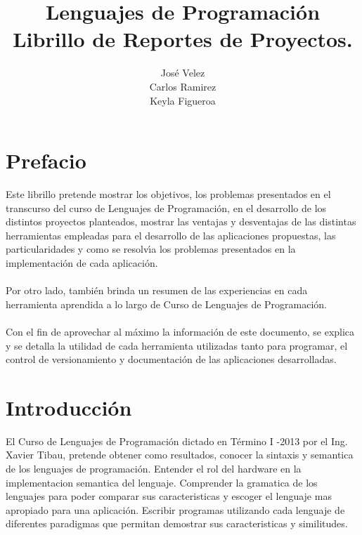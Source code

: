\documentclass[12pt,oneside]{book}
\title{Lenguajes de Programaci\'on \\ Librillo de Reportes de Proyectos.}
\author{Jos\'e Velez \\ Carlos Ramirez \\Keyla Figueroa}
\begin{document}
\maketitle
\tableofcontents



\chapter{Prefacio}

Este librillo pretende mostrar los objetivos, los problemas presentados en el transcurso del curso de Lenguajes de Programaci\'on,
en el desarrollo de los distintos proyectos planteados, mostrar las ventajas y desventajas de las distintas herramientas empleadas
para el desarrollo de las aplicaciones propuestas, las particularidades y como se resolv\'\i{}a los problemas presentados en la implementaci\'on de cada aplicaci\'on. \ \\ \\ 
Por otro lado, tambi\'en brinda un resumen de las experiencias en cada herramienta aprendida a lo largo de Curso de Lenguajes de Programación. \ \\ \\
Con el fin de aprovechar al máximo la información de este documento, se explica y se detalla la utilidad de cada herramienta utilizadas
tanto para programar, el control de versionamiento y documentaci\'on de las aplicaciones desarrolladas.


\chapter{Introducci\'on}

El Curso de Lenguajes de Programaci\'on dictado en T\'ermino I -2013 por el Ing. Xavier Tibau, 
pretende obtener como resultados, conocer la sintaxis y semantica de los lenguajes de programaci\'on.
Entender el rol del hardware en la implementacion semantica del lenguaje.
Comprender la gramatica de los lenguajes para poder comparar sus caracteristicas y escoger
el lenguaje mas apropiado para una aplicaci\'on.
Escribir programas utilizando cada lenguaje de diferentes paradigmas que permitan demostrar
sus caracteristicas y similitudes.









\end{document}
